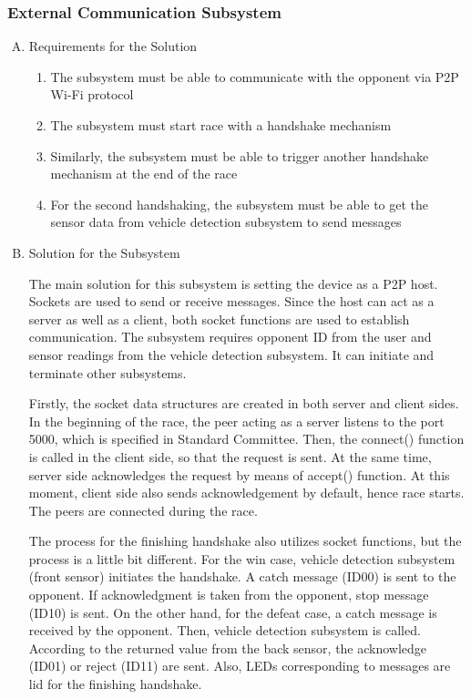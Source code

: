 \documentclass[a4paper,12pt]{article}
\begin{document}
\subsubsection{External Communication Subsystem}	


\begin{enumerate}[A.]

\item {Requirements for the Solution}

\begin{enumerate}[1)]

\item The subsystem must be able to communicate with the opponent via P2P Wi-Fi protocol

\item The subsystem must start race with a handshake mechanism

\item Similarly, the subsystem must be able to trigger another handshake mechanism at the end of the race

\item For the second handshaking, the subsystem must be able to get the sensor data from vehicle detection subsystem to send messages

\end{enumerate}

\item {Solution for the Subsystem}


The main solution for this subsystem is setting the device as a P2P host. Sockets are used to send or receive messages.  Since the host can act as a server as well as a client, both socket functions are used to establish communication. The subsystem requires opponent ID from the user and sensor readings from the vehicle detection subsystem. It can initiate and terminate other subsystems.


Firstly, the socket data structures are created in both server and client sides. In the beginning of the race, the peer acting as a server listens to the port 5000, which is specified in Standard Committee. Then, the connect() function is called in the client side, so that the request is sent. At the same time, server side acknowledges the request by means of accept() function. At this moment, client side also sends acknowledgement by default, hence race starts. The peers are connected during the race.


The process for the finishing handshake also utilizes socket functions, but the process is a little bit different. For the win case, vehicle detection subsystem (front sensor) initiates the handshake. A catch message (ID00) is sent to the opponent. If acknowledgment is taken from the opponent, stop message (ID10) is sent. On the other hand, for the defeat case, a catch message is received by the opponent. Then, vehicle detection subsystem is called. According to the returned value from the back sensor, the acknowledge (ID01) or reject (ID11) are sent. Also, LEDs corresponding to messages are lid for the finishing handshake.




\end{enumerate}
\end{document}
